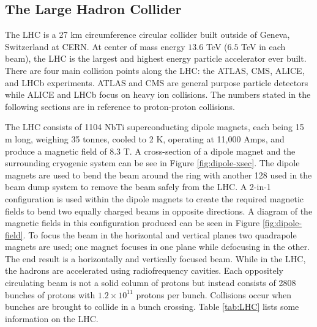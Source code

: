 	\subsection{The Large Hadron Collider}\label{ssec:LHC}
		The \acrfull{LHC} is a 27 km circumference circular collider built outside of Geneva, Switzerland at \acrfull{CERN}. At center of mass energy $13.6$ TeV ($6.5$ TeV in each beam), the \gls{LHC} is the largest and highest energy particle accelerator ever built. There are four main collision points along the \gls{LHC}: the \gls{ATLAS}, \gls{CMS}, ALICE, and LHCb experiments. \gls{ATLAS} and \gls{CMS} are general purpose particle detectors while ALICE and LHCb focus on heavy ion collisions. The numbers stated in the following sections are in reference to proton-proton collisions.

		The LHC consists of 1104 NbTi superconducting dipole magnets, each being 15 m long, weighing 35 tonnes, cooled to 2 K, operating at 11,000 Amps, and produce a magnetic field of 8.3 T. A cross-section of a dipole magnet and the surrounding cryogenic system can be see in Figure \ref{fig:dipole-xsec}. The dipole magnets are used to bend the beam around the ring with another 128 used in the beam dump system to remove the beam safely from the \gls{LHC}. A 2-in-1 configuration is used within the dipole magnets to create the required magnetic fields to bend two equally charged beams in opposite directions. A diagram of the magnetic fields in this configuration produced can be seen in Figure \ref{fig:dipole-field}. To focus the beam in the horizontal and vertical planes two quadrapole magnets are used; one magnet focuses in one plane while defocusing in the other. The end result is a horizontally and vertically focused beam. While in the \gls{LHC}, the hadrons are accelerated using radiofrequency cavities. Each oppositely circulating beam is not a solid column of protons but instead consists of 2808 bunches of protons with $1.2 \times 10^{11}$ protons per bunch. Collisions occur when bunches are brought to collide in a bunch crossing. Table \ref{tab:LHC} lists some information on the \gls{LHC}. 


